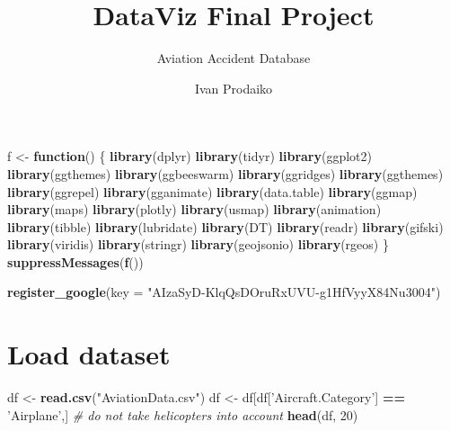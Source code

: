 \documentclass[]{article}
\title{DataViz Final Project}
\subtitle{Aviation Accident Database}
\author{Ivan Prodaiko}
\date{}
\newenvironment{Shaded}{\begin{snugshade}}{\end{snugshade}}
\newcommand{\CommentTok}[1]{\textcolor[rgb]{0.56,0.35,0.01}{\textit{#1}}}
\newcommand{\ControlFlowTok}[1]{\textcolor[rgb]{0.13,0.29,0.53}{\textbf{#1}}}
\newcommand{\DataTypeTok}[1]{\textcolor[rgb]{0.13,0.29,0.53}{#1}}
\newcommand{\DecValTok}[1]{\textcolor[rgb]{0.00,0.00,0.81}{#1}}
\newcommand{\KeywordTok}[1]{\textcolor[rgb]{0.13,0.29,0.53}{\textbf{#1}}}
\newcommand{\NormalTok}[1]{#1}
\newcommand{\OperatorTok}[1]{\textcolor[rgb]{0.81,0.36,0.00}{\textbf{#1}}}
\newcommand{\StringTok}[1]{\textcolor[rgb]{0.31,0.60,0.02}{#1}}
\begin{document}
\maketitle

\begin{Shaded}
\begin{Highlighting}[]
\NormalTok{f <-}\StringTok{ }\ControlFlowTok{function}\NormalTok{() \{}
  \KeywordTok{library}\NormalTok{(dplyr)}
  \KeywordTok{library}\NormalTok{(tidyr)}
  \KeywordTok{library}\NormalTok{(ggplot2)}
  \KeywordTok{library}\NormalTok{(ggthemes)}
  \KeywordTok{library}\NormalTok{(ggbeeswarm)}
  \KeywordTok{library}\NormalTok{(ggridges)}
  \KeywordTok{library}\NormalTok{(ggthemes)}
  \KeywordTok{library}\NormalTok{(ggrepel)}
  \KeywordTok{library}\NormalTok{(gganimate)}
  \KeywordTok{library}\NormalTok{(data.table)}
  \KeywordTok{library}\NormalTok{(ggmap)}
  \KeywordTok{library}\NormalTok{(maps)}
  \KeywordTok{library}\NormalTok{(plotly)}
  \KeywordTok{library}\NormalTok{(usmap)}
  \KeywordTok{library}\NormalTok{(animation)}
  \KeywordTok{library}\NormalTok{(tibble)}
  \KeywordTok{library}\NormalTok{(lubridate)}
  \KeywordTok{library}\NormalTok{(DT)}
  \KeywordTok{library}\NormalTok{(readr)}
  \KeywordTok{library}\NormalTok{(gifski)}
  \KeywordTok{library}\NormalTok{(viridis)}
  \KeywordTok{library}\NormalTok{(stringr)}
  \KeywordTok{library}\NormalTok{(geojsonio)}
  \KeywordTok{library}\NormalTok{(rgeos)}
\NormalTok{\}}
\KeywordTok{suppressMessages}\NormalTok{(}\KeywordTok{f}\NormalTok{())}

\KeywordTok{register_google}\NormalTok{(}\DataTypeTok{key =} \StringTok{"AIzaSyD-KlqQsDOruRxUVU-g1HfVyyX84Nu3004"}\NormalTok{)}
\end{Highlighting}
\end{Shaded}

\hypertarget{load-dataset}{%
\section{Load dataset}\label{load-dataset}}

\begin{Shaded}
\begin{Highlighting}[]
\NormalTok{df <-}\StringTok{ }\KeywordTok{read.csv}\NormalTok{(}\StringTok{"AviationData.csv"}\NormalTok{)}
\NormalTok{df <-}\StringTok{ }\NormalTok{df[df[}\StringTok{'Aircraft.Category'}\NormalTok{] }\OperatorTok{==}\StringTok{ 'Airplane'}\NormalTok{,] }\CommentTok{# do not take helicopters into account}
\KeywordTok{head}\NormalTok{(df, }\DecValTok{20}\NormalTok{)}
\end{Highlighting}
\end{Shaded}
\end{document}

